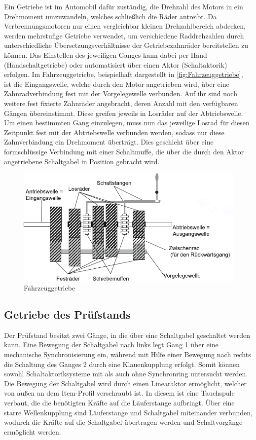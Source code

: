 Ein Getriebe ist im Automobil dafür zuständig, die Drehzahl des Motors in ein Drehmoment umzuwandeln, welches schließlich die Räder antreibt.
Da Verbrennungsmotoren nur einen vergleichbar kleinen Drehzahlbereich abdecken, werden mehrstufige Getriebe verwendet, um verschiedene Raddrehzahlen durch unterschiedliche Übersetzungsverhältnisse der Getriebezahnräder bereitstellen zu können.  Das Einstellen des jeweiligen Ganges kann dabei per Hand (Handschaltgetriebe) oder automatisiert über einen Aktor (Schaltaktorik) erfolgen. 
Im Fahrzeuggetriebe, beispielhaft dargestellt in \autoref{fig:Fahrzeuggetriebe}, ist die Eingangswelle, welche durch den Motor angetrieben wird, über eine Zahnradverbindung  fest mit der  Vorgelegewelle verbunden. Auf ihr sind noch weitere fest fixierte Zahnräder angebracht, deren Anzahl mit den verfügbaren Gängen übereinstimmt. Diese greifen jeweils in Losräder auf der Abtriebswelle. Um einen bestimmten Gang einzulegen, muss nun das jeweilige Losrad für diesen Zeitpunkt fest mit der Abtriebswelle verbunden werden, sodass nur diese Zahnverbindung ein Drehmoment überträgt. Dies geschieht über eine formschlüssige Verbindung mit einer Schaltmuffe, die über die durch den Aktor angetriebene Schaltgabel in Position gebracht wird.

\begin{figure}[h]
	\centering
		\includegraphics{Bilder/Fahrzeuggetriebe.pdf}
	\caption{Fahrzeuggetriebe \cite[S.17]{Hilgers2016}}
	\label{fig:Fahrzeuggetriebe}
\end{figure} \noindent

\subsection{Getriebe des Prüfstands}

Der Prüfstand besitzt zwei Gänge, in die über eine Schaltgabel geschaltet werden kann. Eine Bewegung der Schaltgabel nach links legt Gang 1 über eine mechanische Synchronisierung ein, während mit Hilfe einer Bewegung nach rechts die Schaltung des Ganges 2 durch eine Klauenkupplung erfolgt. Somit können sowohl Schaltaktoriksysteme mit als auch ohne Synchronring untersucht werden.
Die Bewegung der Schaltgabel wird durch einen Linearaktor ermöglicht, welcher von außen an dem Item-Profil verschraubt ist. In diesem ist eine Tauchspule verbaut, die die benötigten Kräfte auf die Läuferstange aufbringt. Über eine starre Wellenkupplung sind Läuferstange und Schaltgabel miteinander verbunden, wodurch die Kräfte auf die Schaltgabel übertragen werden und Schaltvorgänge ermöglicht werden.

